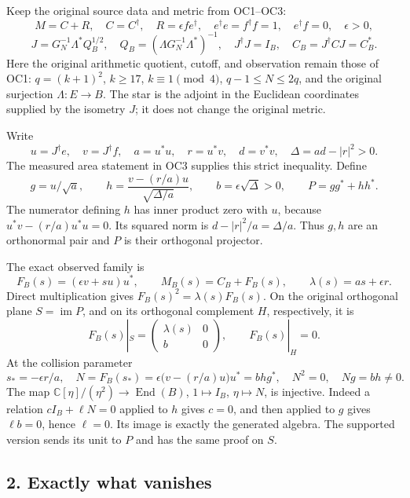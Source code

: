 \documentclass[
  10pt,
  a4paper,
]{article}
\begin{document}
Keep the original source data and metric from OC1--OC3: \[
M=C+R,\quad C=C^\dagger,\quad R=\epsilon fe^\dagger,
\quad e^\dagger e=f^\dagger f=1,\quad e^\dagger f=0,\quad\epsilon>0,
\] \[
J=G_N^{-1}\Lambda^*Q_B^{1/2},\quad
Q_B=(\Lambda G_N^{-1}\Lambda^*)^{-1},\quad J^\dagger J=I_B,
\quad C_B=J^\dagger CJ=C_B^*.
\tag{ISP1}
\] Here the original arithmetic quotient, cutoff, and observation remain
those of OC1: \(q=(k+1)^2\), \(k\ge17\), \(k\equiv1\pmod4\),
\(q-1\le N\le2q\), and the original surjection \(\Lambda:E\to B\). The
star is the adjoint in the Euclidean coordinates supplied by the
isometry \(J\); it does not change the original metric.

Write \[
u=J^\dagger e,\quad v=J^\dagger f,\quad
a=u^*u,\quad r=u^*v,\quad d=v^*v,\quad
\Delta=ad-|r|^2>0.
\] The measured area statement in OC3 supplies this strict inequality.
Define \[
g=u/\sqrt a,\qquad
h=\frac{v-(r/a)u}{\sqrt{\Delta/a}},\qquad
b=\epsilon\sqrt\Delta>0,\qquad P=gg^*+hh^*.
\tag{ISP2}
\] The numerator defining \(h\) has inner product zero with \(u\),
because \(u^*v-(r/a)u^*u=0\). Its squared norm is
\(d-|r|^2/a=\Delta/a\). Thus \(g,h\) are an orthonormal pair and \(P\)
is their orthogonal projector.

The exact observed family is \[
F_B(s)=(\epsilon v+su)u^*,\qquad
M_B(s)=C_B+F_B(s),\qquad
\lambda(s)=as+\epsilon r.
\tag{ISP3}
\] Direct multiplication gives \(F_B(s)^2=\lambda(s)F_B(s)\). On the
original orthogonal plane \(S=\operatorname{im}P\), and on its
orthogonal complement \(H\), respectively, it is \[
F_B(s)|_S=\begin{pmatrix}\lambda(s)&0\\b&0\end{pmatrix},
\qquad F_B(s)|_H=0.
\tag{ISP4}
\] At the collision parameter \[
s_*=-\epsilon r/a,
\quad N=F_B(s_*)=\epsilon\bigl(v-(r/a)u\bigr)u^*=bhg^*,
\quad N^2=0,\quad Ng=bh\ne0.
\tag{ISP5}
\] The map \(\mathbb C[\eta]/(\eta^2)\to\operatorname{End}(B)\),
\(1\mapsto I_B\), \(\eta\mapsto N\), is injective. Indeed a relation
\(cI_B+\ell N=0\) applied to \(h\) gives \(c=0\), and then applied to
\(g\) gives \(\ell b=0\), hence \(\ell=0\). Its image is exactly the
generated algebra. The supported version sends its unit to \(P\) and has
the same proof on \(S\).

\subsection{2. Exactly what vanishes}\label{exactly-what-vanishes}
\end{document}
